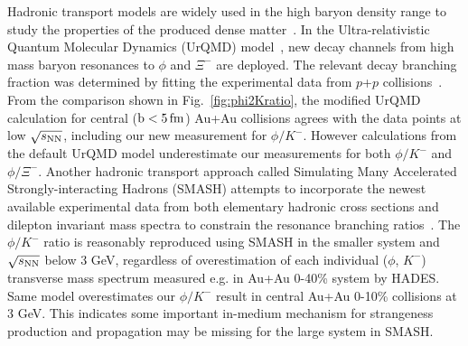 \documentclass[%
 reprint,	
showpacs,
 amsmath,amssymb,
 aps,
 prc,
]{revtex4-1}
\begin{document}
Hadronic transport models are widely used in the high baryon density range to study the properties of the produced dense matter~\cite{urQMD,UrQMD_2,Steinheimer_2015_UrQMD,Elfner_SMASH,Hartnack:2011cn,Song:2020clw}. In the Ultra-relativistic Quantum Molecular Dynamics (UrQMD) model~\cite{Steinheimer_2015_UrQMD}, new decay channels from high mass baryon resonances to $\phi$ and $\Xi^-$ are deployed. The relevant decay branching fraction was determined by fitting the experimental data from $p$+$p$ collisions~\cite{ANKE_phi}. From the comparison shown in Fig.~\ref{fig:phi2Kratio}, the modified UrQMD calculation for central ($\rm{b}<5\,\rm{fm}$) Au+Au collisions agrees with the data points at low ${\sqrt{s_{\rm NN}}}$, including our new measurement for $\phi/K^-$.
However calculations from the default UrQMD model underestimate our measurements for both $\phi/K^-$ and $\phi/\Xi^-$.   
Another hadronic transport approach called Simulating Many Accelerated Strongly-interacting Hadrons (SMASH) attempts to incorporate the newest available experimental data from both elementary hadronic cross sections and dilepton invariant mass spectra to constrain the resonance branching ratios~\cite{Elfner_SMASH}. The $\phi/K^-$ ratio is reasonably reproduced using SMASH in the smaller system and ${\sqrt{s_{\rm NN}}}$ below 3 GeV, regardless of overestimation of each individual ($\phi$, $K^-$) transverse mass spectrum measured e.g. in Au+Au 0-40\% system by HADES. Same model overestimates our $\phi/K^-$ result in central Au+Au 0-10\% collisions at 3 GeV. This indicates some important in-medium mechanism for strangeness production and propagation may be missing for the large system in SMASH.
\end{document}
